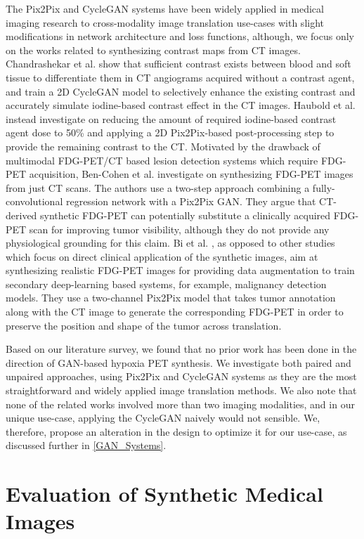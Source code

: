 The Pix2Pix and CycleGAN systems have been widely applied in medical imaging research to cross-modality image translation use-cases \cite{yi2019generative} with slight modifications in network architecture and loss functions, although, we focus only on the works related to synthesizing contrast maps from CT images. Chandrashekar et al. \cite{chandrashekar2020deep} show that sufficient contrast exists between blood and soft tissue to differentiate them in CT angiograms acquired without a contrast agent, and train a 2D CycleGAN model to selectively enhance the existing contrast and accurately simulate iodine-based contrast effect in the CT images. Haubold et al. \cite{haubold2021contrast} instead investigate on reducing the amount of required iodine-based contrast agent dose to 50\% and applying a 2D Pix2Pix-based post-processing step to provide the remaining contrast to the CT. Motivated by the drawback of multimodal FDG-PET/CT based lesion detection systems which require FDG-PET acquisition, Ben-Cohen et al. \cite{bencohen2018crossmodality} investigate on synthesizing FDG-PET images from just CT scans. The authors use a two-step approach combining a fully-convolutional regression network with a Pix2Pix GAN. They argue that CT-derived synthetic FDG-PET can potentially substitute a clinically acquired FDG-PET scan for improving tumor visibility, although they do not provide any physiological grounding for this claim. Bi et al. \cite{bi2017synthesis}, as opposed to other studies which focus on direct clinical application of the synthetic images, aim at synthesizing realistic FDG-PET images for providing data augmentation to train secondary deep-learning based systems, for example, malignancy detection models. They use a two-channel Pix2Pix model that takes tumor annotation along with the CT image to generate the corresponding FDG-PET in order to preserve the position and shape of the tumor across translation. 

Based on our literature survey, we found that no prior work has been done in the direction of GAN-based hypoxia PET synthesis. We investigate both paired and unpaired approaches, using Pix2Pix and CycleGAN systems as they are the most straightforward and widely applied image translation methods. We also note that none of the related works involved more than two imaging modalities, and in our unique use-case, applying the CycleGAN naively would not sensible. We, therefore, propose an alteration in the design to optimize it for our use-case, as discussed further in \ref{GAN_Systems}.



\section{Evaluation of Synthetic Medical Images}
